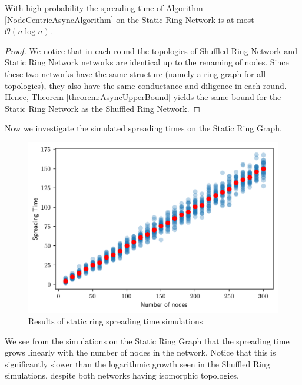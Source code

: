 \begin{theorem}\label{theorem:staticRingAsyncBound}
	With high probability the spreading time of Algorithm \ref{NodeCentricAsyncAlgorithm} on the Static Ring Network is at most $\mathcal{O}(n \log n)$.
\end{theorem}

\begin{proof}
	We notice that in each round the topologies of Shuffled Ring Network and Static Ring Network networks are identical up to the renaming of nodes. Since these two networks have the same structure (namely a ring graph for all topologies), they also have the same conductance and diligence in each round. Hence, Theorem \ref{theorem:AsyncUpperBound} yields the same bound for the Static Ring Network as the Shuffled Ring Network. %
\end{proof}


Now we investigate the simulated spreading times on the Static Ring Graph.

\begin{figure}[h]
	\centering
	\includegraphics[width=1\textwidth]{./figures/static_ring_simulation_results.png}
	\caption{Results of static ring spreading time simulations}
	\label{fig:staticRingSimResults}
\end{figure}

We see from the simulations on the Static Ring Graph that the spreading time grows linearly with the number of nodes in the network. Notice that this is significantly slower than the logarithmic growth seen in the Shuffled Ring simulations, despite both networks having isomorphic topologies. %

